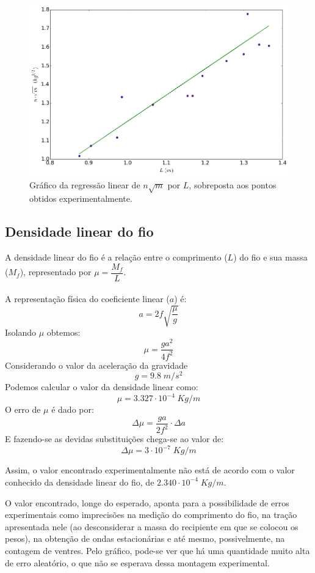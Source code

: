 \documentclass[12pt,a4paper]{article}
\begin{document}
\begin{figure} [!htbp]

\includegraphics[scale=0.6]{graf1.png}
\caption{Gráfico da regressão linear de $n\sqrt{m}$ por $L$, sobreposta aos pontos obtidos experimentalmente.}

\end{figure}
\subsection{Densidade linear do fio}
A densidade linear do fio é a relação entre o comprimento ($L$) do fio e sua massa ($M_f$), representado por $\mu = \dfrac{M_f}{L}$.\\\\
A representação física do coeficiente linear ($a$) é:
$$a = 2f \sqrt{\dfrac{\mu}{g}}$$
Isolando $\mu$ obtemos:
$$ \mu = \dfrac{ga^2}{4f^2} $$
Considerando o valor da aceleração da gravidade 
$$g = 9.8 \; m/s^2 $$
Podemos calcular o valor da densidade linear como:
$$ \mu = 3.327 \cdot 10^{-4} \; Kg/m$$
O erro de $\mu$ é dado por:
$$ \Delta \mu = \dfrac{ga}{2f^2} \cdot \Delta a$$
E fazendo-se as devidas substituições chega-se ao valor de:
$$\Delta \mu = 3 \cdot 10^{-7} \; Kg/m$$

Assim, o valor encontrado experimentalmente não está de acordo com o valor conhecido da densidade linear do fio, de $2.340 \cdot 10^{-4} \; Kg/m$.


O valor encontrado, longe do esperado, aponta para a possibilidade de erros experimentais como imprecisões na medição do comprimento do fio, na tração apresentada nele (ao desconsiderar a massa do recipiente em que se colocou os pesos), na obtenção de ondas estacionárias e até mesmo, possivelmente, na contagem de ventres. Pelo gráfico, pode-se ver que há uma quantidade muito alta de erro aleatório, o que não se esperava dessa montagem experimental.
\end{document}
